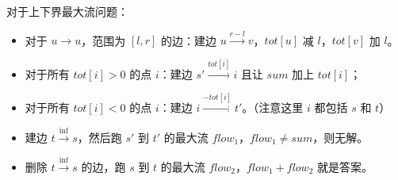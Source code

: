 对于上下界最大流问题：

\begin{itemize}
\item 对于 $u \to u$，范围为 $[l, r]$ 的边：建边 $u \xrightarrow{r - l} v$，$tot[u]$ 减 $l$，$tot[v]$ 加 $l$。
\item 对于所有 $tot[i] > 0$ 的点 $i$：建边 $s' \xrightarrow{tot[i]} i$ 且让 $sum$ 加上 $tot[i]$；
\item 对于所有 $tot[i] < 0$ 的点 $i$：建边 $i \xrightarrow{-tot[i]} t'$。（注意这里 $i$ 都包括 $s$ 和 $t$）
\item 建边 $t \xrightarrow{\inf} s$，然后跑 $s'$ 到 $t'$ 的最大流 $flow_1$，$flow_1 \neq sum$，则无解。
\item 删除 $t \xrightarrow{\inf} s$ 的边，跑 $s$ 到 $t$ 的最大流 $flow_2$，$flow_1 + flow_2$ 就是答案。
\end{itemize}

